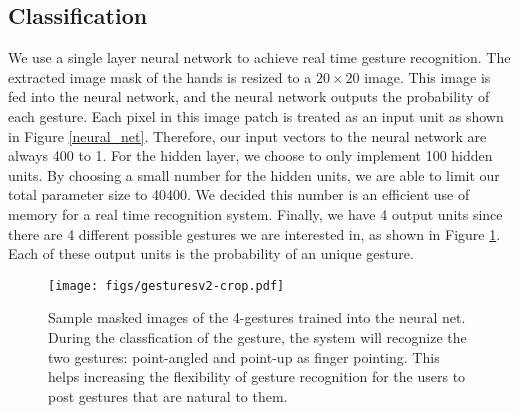 \documentclass[conference]{IEEEtran}
\begin{document}
\subsection{Classification}
We use a single layer neural network to achieve real time gesture recognition. The extracted image mask of the hands is resized to a $20\times20$ image. This image is fed into the neural network, and the neural network outputs the probability of each gesture. Each pixel in this image patch is treated as an input unit as shown in Figure \ref{neural_net}. Therefore, our input vectors to the neural network are always 400 to 1. For the hidden layer, we choose to only implement 100 hidden units. By choosing a small number for the hidden units, we are able to limit our total parameter size to 40400. We decided this number is an efficient use of memory for a real time recognition system. Finally, we have 4 output units since there are 4 different possible gestures we are interested in, as shown in Figure \ref{gestures}. Each of these output units is the probability of an unique gesture.
\begin{figure}
\centering
\texttt{[image: figs/gesturesv2-crop.pdf]}
\caption{Sample masked images of the 4-gestures trained into the neural net. During the classfication of the gesture, the system will recognize the two gestures: point-angled and point-up as finger pointing. This helps increasing the flexibility of gesture recognition for the users to post gestures that are natural to them.}
\label{gestures}
\end{figure}
\end{document}
